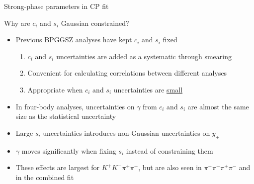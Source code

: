 \documentclass[xcolor={dvipsnames}]{beamer}
\begin{document}
\begin{frame}{Strong-phase parameters in CP fit}
  \begin{center}
    {\large Why are $c_i$ and $s_i$ Gaussian constrained?}
  \end{center}
  \begin{itemize}
    \setlength\itemsep{1.0em}
    \item{Previous BPGGSZ analyses have kept $c_i$ and $s_i$ fixed}
    \begin{enumerate}
      \item{$c_i$ and $s_i$ uncertainties are added as a systematic through smearing}
      \item{Convenient for calculating correlations between different analyses}
      \item{Appropriate when $c_i$ and $s_i$ uncertainties are \underline{small}}
    \end{enumerate}
    \item{In four-body analyses, uncertainties on $\gamma$ from $c_i$ and $s_i$ are almost the same size as the statistical uncertainty}
    \item{Large $s_i$ uncertainties introduces non-Gaussian uncertainties on $y_\pm$}
    \item{$\gamma$ moves significantly when fixing $s_i$ instead of constraining them}
    \item{These effects are largest for $K^+K^-\pi^+\pi^-$, but are also seen in $\pi^+\pi^-\pi^+\pi^-$ and in the combined fit}
  \end{itemize}
\end{frame}
\end{document}

